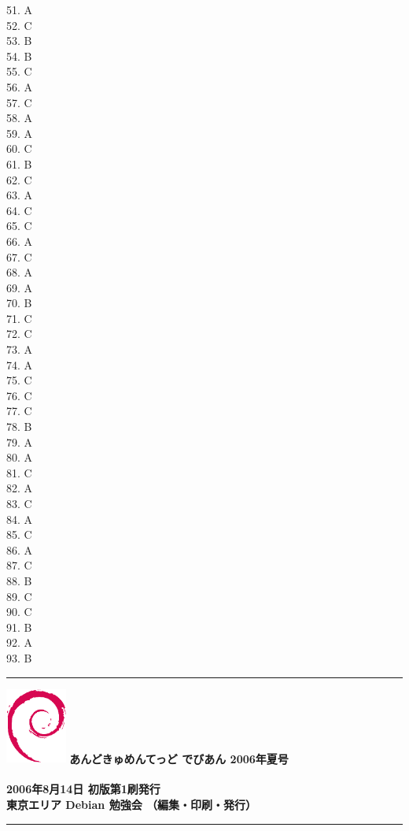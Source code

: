 \documentclass[mingoth,a4paper]{jsarticle}
\begin{document}
51. A\\
52. C\\
53. B\\
54. B\\
55. C\\
56. A\\
57. C\\
58. A\\
59. A\\
60. C\\
61. B\\
62. C\\
63. A\\
64. C\\
65. C\\
66. A\\
67. C\\
68. A\\
69. A\\
70. B\\
71. C\\
72. C\\
73. A\\
74. A\\
75. C\\
76. C\\
77. C\\
78. B\\
79. A\\
80. A\\
81. C\\
82. A\\
83. C\\
84. A\\
85. C\\
86. A\\
87. C\\
88. B\\
89. C\\
90. C\\
91. B\\
92. A\\
93. B\\

\onecolumn
\newpage

\vspace*{15cm}
\hrule
\vspace{2mm}
\includegraphics[width=2cm]{image200502/openlogo-nd.eps}
\noindent \Large \bf あんどきゅめんてっど でびあん 2006年夏号\\ \\
\noindent \normalfont 2006年8月14日 \hspace{5mm}  初版第1刷発行\\
\noindent \normalfont 東京エリア Debian 勉強会 （編集・印刷・発行）\\
\hrule
\end{document}
